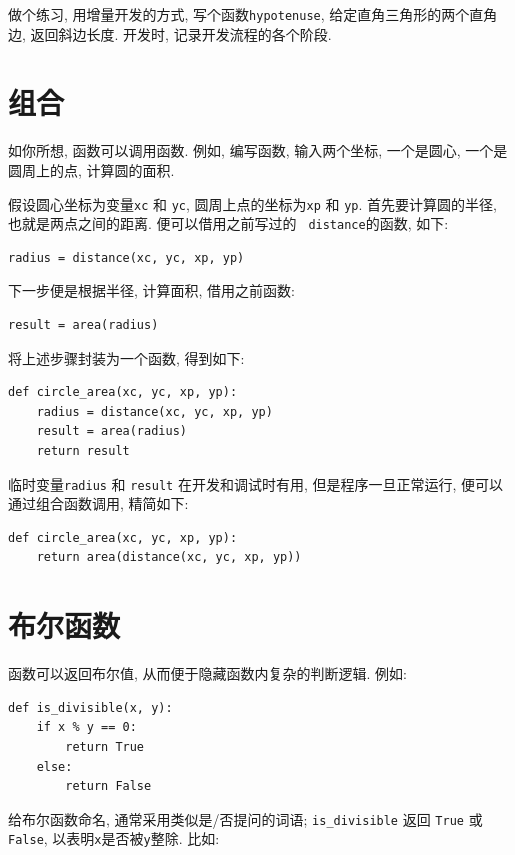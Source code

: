 \documentclass[10pt]{book}
\begin{document}
做个练习, 用增量开发的方式, 写个函数{\tt hypotenuse}, 
给定直角三角形的两个直角边, 返回斜边长度. 
开发时, 记录开发流程的各个阶段. 



\section{组合}

如你所想, 函数可以调用函数. 
例如, 编写函数, 输入两个坐标, 一个是圆心, 一个是圆周上的点, 
计算圆的面积. 

假设圆心坐标为变量{\tt xc} 和
{\tt yc}, 圆周上点的坐标为{\tt xp} 和 {\tt yp}.
首先要计算圆的半径, 也就是两点之间的距离. 
便可以借用之前写过的 {\tt
distance}的函数, 如下:

\begin{verbatim}
radius = distance(xc, yc, xp, yp)
\end{verbatim}
%
下一步便是根据半径, 计算面积, 借用之前函数:

\begin{verbatim}
result = area(radius)
\end{verbatim}
%
将上述步骤封装为一个函数, 得到如下:

\begin{verbatim}
def circle_area(xc, yc, xp, yp):
    radius = distance(xc, yc, xp, yp)
    result = area(radius)
    return result
\end{verbatim}
%
临时变量{\tt radius} 和 {\tt result} 在开发和调试时有用, 但是程序一旦正常运行, 
便可以通过组合函数调用, 精简如下:

\begin{verbatim}
def circle_area(xc, yc, xp, yp):
    return area(distance(xc, yc, xp, yp))
\end{verbatim}
%

\section{布尔函数}
\label{boolean}

函数可以返回布尔值, 从而便于隐藏函数内复杂的判断逻辑.  
例如:

\begin{verbatim}
def is_divisible(x, y):
    if x % y == 0:
        return True
    else:
        return False
\end{verbatim}
%
给布尔函数命名, 通常采用类似是/否提问的词语; 
\verb"is_divisible" 返回 {\tt True} 或 {\tt False}, 
以表明{\tt x}是否被{\tt y}整除. 
比如:
\end{document}
